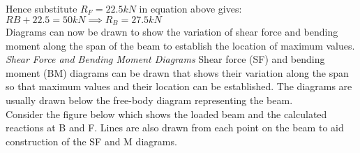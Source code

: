 \documentclass[12pt, letterpaper, twoside]{article}
\begin{document}
Hence substitute $R_F = 22.5 kN$ in equation above gives: $RB + 22.5 = 50kN \implies	R_B = 27.5 kN$ \\

Diagrams can now be drawn to show the variation of shear force and bending moment along the span of the beam to establish the location of maximum values.\\

\emph{Shear Force and Bending Moment Diagrams}
Shear force (SF) and bending moment (BM) diagrams can be drawn that shows their variation along the span so that maximum values and their location can be established. The diagrams are usually drawn below the free-body diagram representing the beam.\\
Consider the figure below which shows the loaded beam and the calculated reactions at B and F. Lines are also drawn from each point on the beam to aid construction of the SF and M diagrams.
\end{document}
